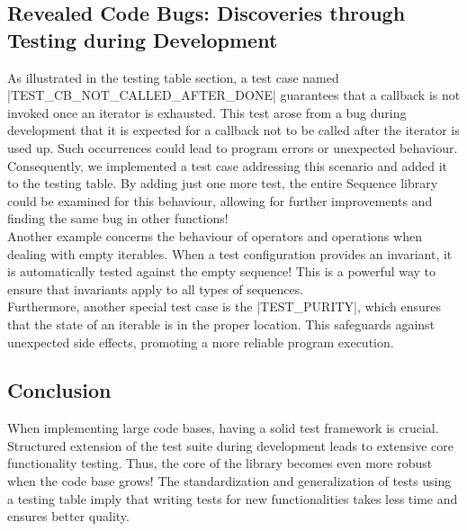 \subsection{Revealed Code Bugs: Discoveries through Testing during Development}
\label{sub:Revealed Code Bugs: Discoveries through Testing during Development}
As illustrated in the testing table section, a test case named
|TEST_CB_NOT_CALLED_AFTER_DONE| guarantees that a callback is not invoked once
an iterator is exhausted. This test arose from a bug during development
that it is expected for a callback not to be called after the iterator is used
up. Such occurrences could lead to program errors or unexpected behaviour.
Consequently, we implemented a test case addressing this scenario and added it
to the testing table. By adding just one more test, the entire Sequence library
could be examined for this behaviour, allowing for further improvements and
finding the same bug in other functions!\\
Another example concerns the behaviour of operators and operations when dealing
with empty iterables. When a test configuration provides an invariant,
it is automatically tested against the empty sequence! This is a powerful way
to ensure that invariants apply to all types of sequences.\\
Furthermore, another special test case is the |TEST_PURITY|, which ensures that
the state of an iterable is in the proper location. This safeguards against
unexpected side effects, promoting a more reliable program execution.

\subsection{Conclusion}
\label{sub:Conclusion}
When implementing large code bases, having a solid test framework is crucial.
Structured extension of the test suite during development leads to extensive
core functionality testing. Thus, the core of the library becomes even more
robust when the code base grows!
\newline
The standardization and generalization of tests using a testing table imply that
writing tests for new functionalities takes less time and ensures better
quality.

